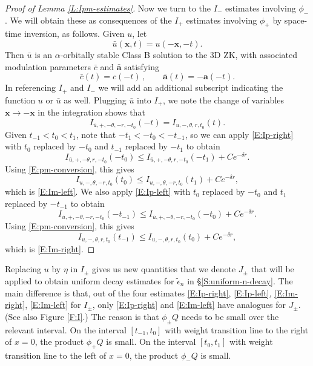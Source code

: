 \documentclass[12pt,letterpaper]{amsart}
\theoremstyle{remark}
\numberwithin{equation}{section}
\numberwithin{theorem}{section}
\numberwithin{table}{section}
\begin{document}
\begin{proof}[Proof of Lemma \ref{L:Ipm-estimates}]
Now we turn to the $I_-$ estimates involving $\phi_-$.  We will obtain these as consequences of the $I_+$ estimates involving $\phi_+$ by space-time inversion, as follows.  Given $u$, let
$$
\bar u(\mathbf{x},t) = u(-\mathbf{x},-t).
$$
Then $\bar u$ is an $\alpha$-orbitally stable Class B solution to the 3D ZK, with associated modulation parameters $\bar c$ and $\bar{\mathbf{a}}$ satisfying
$$
\bar c(t) = c(-t) \,, \qquad \bar{\mathbf{a}}(t) = -\mathbf{a}(-t).
$$
In referencing $I_+$ and $I_-$ we will add an additional subscript indicating the function $u$ or $\bar u$ as well.  Plugging $\bar u$ into $I_+$, we note the change of variables $\mathbf{x}\to -\mathbf{x}$ in the integration shows that
\begin{equation}
\label{E:pm-conversion}
I_{\bar u, +,-\theta,-r,-t_0}(-t) = I_{u, -, \theta,r,t_0}(t).
\end{equation}
Given $t_{-1}<t_0<t_1$, note that $-t_1<-t_0<-t_{-1}$, so we can apply \eqref{E:Ip-right} with $t_0$ replaced by $-t_0$ and $t_{-1}$ replaced by $-t_1$ to obtain
$$
I_{\bar u, +, -\theta,r,-t_0}(-t_0) \leq I_{\bar u, +, -\theta, r, -t_0}(-t_1) + Ce^{-\delta r}.
$$
Using \eqref{E:pm-conversion}, this gives
$$
I_{u,-,\theta,-r,t_0}(t_0) \leq I_{u,-,\theta,-r,t_0}(t_1) + Ce^{-\delta r},
$$
which is \eqref{E:Im-left}.  We also apply \eqref{E:Ip-left} with $t_0$ replaced by $-t_0$ and $t_1$ replaced by $-t_{-1}$ to obtain
$$
I_{\bar u,+,-\theta, -r,-t_0}(-t_{-1}) \leq I_{\bar u,+,-\theta, -r,-t_0}(-t_0) + Ce^{-\delta r}.
$$
Using \eqref{E:pm-conversion}, this gives
$$
I_{u,-,\theta, r,t_0}(t_{-1}) \leq I_{u,-,\theta, r,t_0}(t_0) + Ce^{-\delta r},
$$
which is \eqref{E:Im-right}.

\end{proof}



Replacing $u$ by $\eta$ in $I_\pm$ gives us new quantities that we denote $J_\pm$ that will be applied to obtain uniform decay estimates for $\tilde \epsilon_n$ in \S \ref{S:uniform-n-decay}.   The main difference is that, out of the four estimates \eqref{E:Ip-right}, \eqref{E:Ip-left}, \eqref{E:Im-right}, \eqref{E:Im-left} for $I_\pm$, only \eqref{E:Ip-right} and \eqref{E:Im-left} have analogues for $J_\pm$. (See also Figure \ref{F:I}.)  The reason is that $\phi_\pm Q$ needs to be small over the relevant interval.  On the interval $[t_{-1},t_0]$ with weight transition line to the right of $x=0$, the product $\phi_+Q$ is small.  On the interval $[t_0,t_1]$ with weight transition line to the left of $x=0$, the product $\phi_-Q$ is small. 
\end{document}
